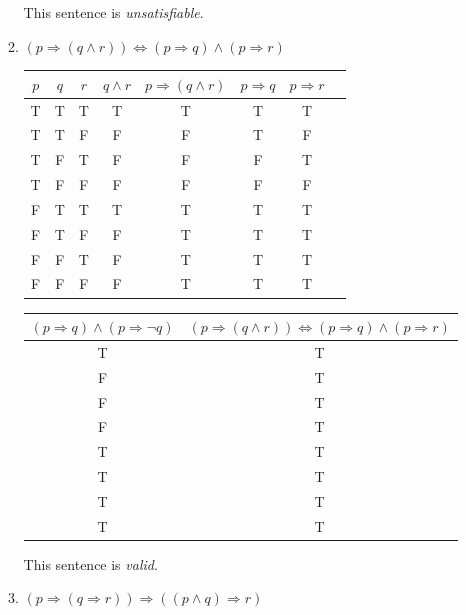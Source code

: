 \documentclass{article}
\begin{document}
\begin{enumerate}
\begin{enumerate}
				This sentence is \emph{unsatisfiable}.
				
			\item $(p \Rightarrow ( q \wedge r)) \Leftrightarrow (p \Rightarrow q) \wedge (p \Rightarrow r)$
			
				\begin{tabular}{|c|c|c|c|c|c|c|c|}
					\hline
					$p$ & $q$ & $r$ & $q \wedge r$ & $p \Rightarrow (q \wedge r)$ & $p \Rightarrow q$ 
					& $p \Rightarrow r$ \\
					\hline
					T & T & T & T & T & T & T \\
					\hline
					T & T & F & F & F & T & F\\
					\hline
					T & F & T & F & F & F & T  \\
					\hline
					T & F & F & F & F & F & F  \\
					\hline
					F & T & T & T & T & T & T \\
					\hline
					F & T & F & F & T & T & T \\
					\hline
					F & F & T & F & T & T & T \\
					\hline
					F & F & F & F & T & T & T \\
					\hline
				\end{tabular}

				\begin{tabular}{|c|c|}
					\hline
					$(p \Rightarrow q) \wedge ( p \Rightarrow \neg q)$ &
					 $(p \Rightarrow ( q \wedge r)) \Leftrightarrow (p \Rightarrow q) \wedge (p \Rightarrow r)$ \\
					\hline
					T & T \\
					\hline
					F & T \\
					\hline
					F & T \\
					\hline
					F & T \\
					\hline
					T & T\\
					\hline
					T & T\\
					\hline
					T & T\\
					\hline
					T & T\\
					\hline
				\end{tabular}

				This sentence is \emph{valid}.

				\item $(p \Rightarrow (q \Rightarrow r)) \Rightarrow ((p \wedge q) \Rightarrow r)$


\end{enumerate}
\end{enumerate}
\end{document}
